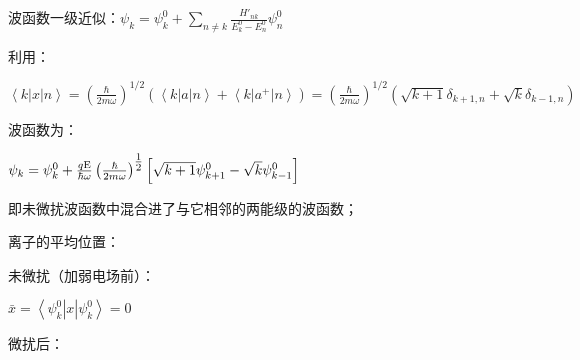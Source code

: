波函数一级近似：$\psi _k  = \psi _k^0  + \sum\limits_{n \ne k} {\frac{{H'_{nk} }}{{E_k^0  - E_n^0 }}\psi _n^0 } $

利用：

\begin{center}
$\left\langle k \right|x\left| n \right\rangle  = \left( {\frac{\hbar }{{2m\omega }}} \right)^{1/2} \left( {\left\langle k \right|a\left| n \right\rangle  + \left\langle k \right|a^ +  \left| n \right\rangle } \right) = \left( {\frac{\hbar }{{2m\omega }}} \right)^{1/2} \left( {\sqrt {k + 1} \delta _{k + 1,n}  + \sqrt k \delta _{k - 1,n} } \right)$
\end{center}

波函数为：

\begin{center}
$\psi _k  = \psi _k^0  + \frac{{q{\rm E}}}{{\hbar \omega }}\left( {\frac{\hbar }{{2m\omega }}} \right)^{{\textstyle{1 \over 2}}} \left[ {\sqrt {k + 1} \psi _{k + 1}^0  - \sqrt k \psi _{k - 1}^0 } \right]$
\end{center}

即未微扰波函数中混合进了与它相邻的两能级的波函数；


离子的平均位置：

未微扰（加弱电场前）：

\begin{center}
$\bar x = \left\langle {\psi _k^0 } \right|x\left| {\psi _k^0 } \right\rangle  = 0$
\end{center}

微扰后：


